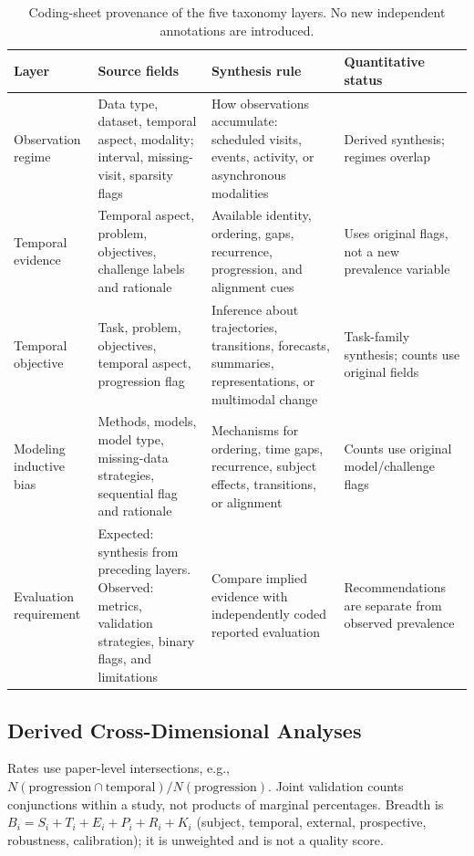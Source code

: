 \documentclass[11pt]{article}
\theoremstyle{plain}
\theoremstyle{definition}
\theoremstyle{remark}
\begin{document}
\begin{table}[htbp]
\centering\small
\begin{tabularx}{\textwidth}{p{2.5cm}XXX}
\toprule
\textbf{Layer} & \textbf{Source fields} & \textbf{Synthesis rule} & \textbf{Quantitative status}\\
\midrule
Observation regime & Data type, dataset, temporal aspect, modality; interval, missing-visit, sparsity flags & How observations accumulate: scheduled visits, events, activity, or asynchronous modalities & Derived synthesis; regimes overlap\\
Temporal evidence & Temporal aspect, problem, objectives, challenge labels and rationale & Available identity, ordering, gaps, recurrence, progression, and alignment cues & Uses original flags, not a new prevalence variable\\
Temporal objective & Task, problem, objectives, temporal aspect, progression flag & Inference about trajectories, transitions, forecasts, summaries, representations, or multimodal change & Task-family synthesis; counts use original fields\\
Modeling inductive bias & Methods, models, model type, missing-data strategies, sequential flag and rationale & Mechanisms for ordering, time gaps, recurrence, subject effects, transitions, or alignment & Counts use original model/challenge flags\\
Evaluation requirement & Expected: synthesis from preceding layers. Observed: metrics, validation strategies, binary flags, and limitations & Compare implied evidence with independently coded reported evaluation & Recommendations are separate from observed prevalence\\
\bottomrule
\end{tabularx}
\caption{Coding-sheet provenance of the five taxonomy layers. No new independent annotations are introduced.}
\label{tab:taxonomy_operationalization}
\end{table}

\subsection{Derived Cross-Dimensional Analyses}
\label{sec:appendix_derived_analyses}
Rates use paper-level intersections, e.g., $N(\mathrm{progression}\cap\mathrm{temporal})/N(\mathrm{progression})$. Joint validation counts conjunctions within a study, not products of marginal percentages. Breadth is $B_i=S_i+T_i+E_i+P_i+R_i+K_i$ (subject, temporal, external, prospective, robustness, calibration); it is unweighted and is not a quality score.
\end{document}
